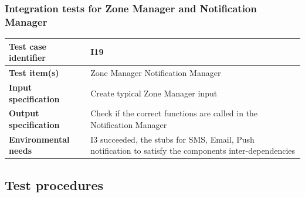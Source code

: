 \documentclass[a4paper,11pt]{report} %
\begin{document}
		\subsubsection{Integration tests for Zone Manager and Notification Manager} \label{sec:3.1.16}
			\begin{minipage}{\linewidth}
			\end{minipage}		
		\begin{center}
			\renewcommand{\arraystretch}{1.2}
			\setlength{\tabcolsep}{24pt}
			\begin{tabular}{ l  p{9cm}}\hline
				\textbf{Test case identifier} & I19\\\hline
				\textbf{Test item(s)} & Zone Manager \textrightarrow Notification Manager\\\hline
				\textbf{Input specification} & Create typical Zone Manager input \\\hline
				\textbf{Output specification} & Check if the correct functions are called in the Notification Manager\\\hline
				\textbf{Environmental needs} &  I3 succeeded, the stubs for SMS, Email, Push notification to satisfy the components inter-dependencies\\\hline
			\end{tabular}
		\end{center}	
		
		\bigskip
		\subsection{Test procedures}		
\end{document}
